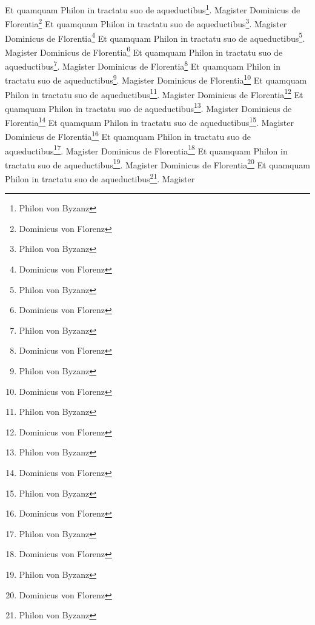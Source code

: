 \documentclass{book}
\begin{document}
\begin{pairs}
\begin{Rightside}
Et quamquam Philon in tractatu suo de aqueductibus\footnote{Philon von Byzanz}. Magister Dominicus de Florentia\footnote{Dominicus von Florenz}
Et quamquam Philon in tractatu suo de aqueductibus\footnote{Philon von Byzanz}. Magister Dominicus de Florentia\footnote{Dominicus von Florenz}
Et quamquam Philon in tractatu suo de aqueductibus\footnote{Philon von Byzanz}. Magister Dominicus de Florentia\footnote{Dominicus von Florenz}
Et quamquam Philon in tractatu suo de aqueductibus\footnote{Philon von Byzanz}. Magister Dominicus de Florentia\footnote{Dominicus von Florenz}
Et quamquam Philon in tractatu suo de aqueductibus\footnote{Philon von Byzanz}. Magister Dominicus de Florentia\footnote{Dominicus von Florenz}
Et quamquam Philon in tractatu suo de aqueductibus\footnote{Philon von Byzanz}. Magister Dominicus de Florentia\footnote{Dominicus von Florenz}
Et quamquam Philon in tractatu suo de aqueductibus\footnote{Philon von Byzanz}. Magister Dominicus de Florentia\footnote{Dominicus von Florenz}
Et quamquam Philon in tractatu suo de aqueductibus\footnote{Philon von Byzanz}. Magister Dominicus de Florentia\footnote{Dominicus von Florenz}
Et quamquam Philon in tractatu suo de aqueductibus\footnote{Philon von Byzanz}. Magister Dominicus de Florentia\footnote{Dominicus von Florenz}
Et quamquam Philon in tractatu suo de aqueductibus\footnote{Philon von Byzanz}. Magister Dominicus de Florentia\footnote{Dominicus von Florenz}
Et quamquam Philon in tractatu suo de aqueductibus\footnote{Philon von Byzanz}. Magister 



\pend
\endnumbering
\end{Rightside}

\end{pairs}
\Columns
\end{document}
